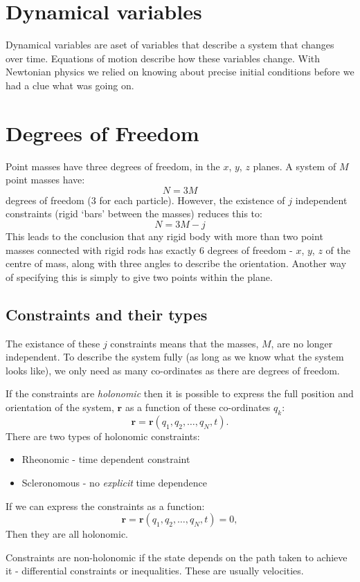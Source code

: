 \section{Dynamical variables}
Dynamical variables are aset of variables that describe a system that changes
over time. Equations of motion describe how these variables change. With
Newtonian physics we relied on knowing about precise initial conditions before
we had a clue what was going on.

\section{Degrees of Freedom} 
Point masses have three degrees of freedom, in the $x$, $y$, $z$ planes. A
system of $M$ point masses have:
$$	
	N = 3M
$$
degrees of freedom (3 for each particle). However, the existence of $j$
independent constraints (rigid `bars' between the masses) reduces this to:
$$
	N = 3M - j
$$
This leads to the conclusion that any rigid body with more than two point masses
connected with rigid rods has exactly 6 degrees of freedom - $x$, $y$, $z$ of
the centre of mass, along with three angles to describe the orientation. Another
way of specifying this is simply to give two points within the plane.

\subsection{Constraints and their types}
The existance of these $j$ constraints means that the masses, $M$, are no longer
independent. To describe the system fully (as long as we know what the system
looks like), we only need as many co-ordinates as there are degrees of freedom.

If the constraints are \emph{holonomic} then it is possible to express the
full position and orientation of the system, $\bm{r}$ as a function of these
co-ordinates $q_k$:
$$
	\bm{r} = \bm{r}(q_1, q_2, \hdots, q_N, t).
$$
There are two types of holonomic constraints:
\begin{itemize}
	\item Rheonomic - time dependent constraint
	\item Scleronomous - no \emph{explicit} time dependence
\end{itemize}
If we can express the constraints as a function:
$$
    \bm{r} = \bm{r}(q_1, q_2, \hdots, q_N, t) = 0,
$$
Then they are all holonomic.

Constraints are non-holonomic if the state depends on the path taken to achieve
it - differential constraints or inequalities. These are usually velocities.

